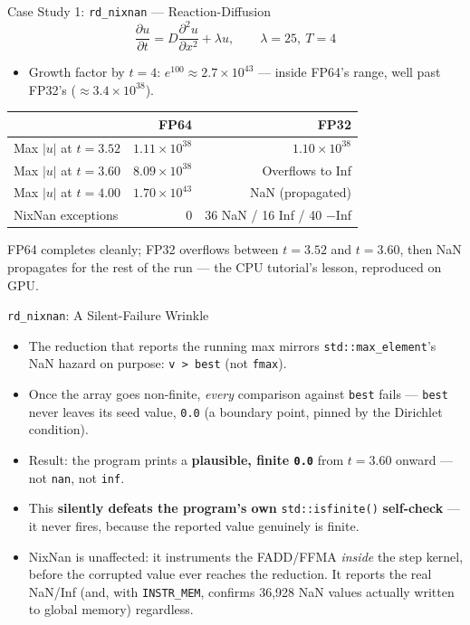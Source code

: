 \documentclass[aspectratio=169,11pt]{beamer}
\begin{document}
\begin{frame}{Case Study 1: \texttt{rd\_nixnan} --- Reaction-Diffusion}
\[
\frac{\partial u}{\partial t} = D\frac{\partial^2 u}{\partial x^2} + \lambda u,
\qquad \lambda = 25,\ T=4
\]
\begin{itemize}
  \item Growth factor by $t{=}4$: $e^{100}\approx2.7\times10^{43}$ --- inside
    FP64's range, well past FP32's ($\approx3.4\times10^{38}$).
\end{itemize}
\begin{center}
\begin{tabular}{lrr}
\toprule
 & FP64 & FP32 \\
\midrule
Max $|u|$ at $t=3.52$ & $1.11\times10^{38}$ & $1.10\times10^{38}$ \\
Max $|u|$ at $t=3.60$ & $8.09\times10^{38}$ & Overflows to Inf \\
Max $|u|$ at $t=4.00$ & $1.70\times10^{43}$ & NaN (propagated) \\
NixNan exceptions & 0 & 36 NaN / 16 Inf / 40 $-$Inf \\
\bottomrule
\end{tabular}
\end{center}
FP64 completes cleanly; FP32 overflows between $t=3.52$ and $t=3.60$, then NaN
propagates for the rest of the run --- the CPU tutorial's lesson, reproduced on GPU.
\end{frame}

\begin{frame}{\texttt{rd\_nixnan}: A Silent-Failure Wrinkle}
\begin{itemize}
  \item The reduction that reports the running max mirrors
    \texttt{std::max\_element}'s NaN hazard on purpose: \texttt{v > best}
    (not \texttt{fmax}).
  \item Once the array goes non-finite, \emph{every} comparison against
    \texttt{best} fails --- \texttt{best} never leaves its seed value,
    \texttt{0.0} (a boundary point, pinned by the Dirichlet condition).
  \item Result: the program prints a \textbf{plausible, finite \texttt{0.0}}
    from $t{=}3.60$ onward --- not \texttt{nan}, not \texttt{inf}.
  \item This \textbf{silently defeats the program's own}
    \texttt{std::isfinite()} \textbf{self-check} --- it never fires, because
    the reported value genuinely is finite.
  \item NixNan is unaffected: it instruments the FADD/FFMA \emph{inside} the
    step kernel, before the corrupted value ever reaches the reduction. It
    reports the real NaN/Inf (and, with \texttt{INSTR\_MEM}, confirms
    36{,}928 NaN values actually written to global memory) regardless.
\end{itemize}
\end{frame}
\end{document}
